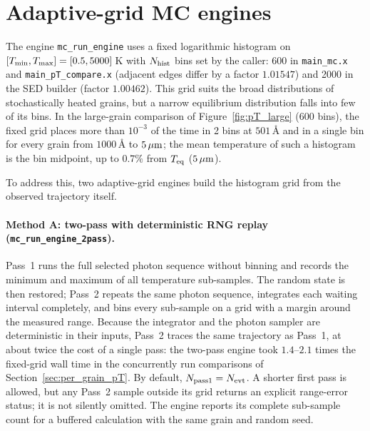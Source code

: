 \documentclass{my_memo}
\newcommand{\Teq}{T_{\rm eq}}
\newcommand{\umc}{\,\mu{\rm m}}
\newcommand{\evt}{N_{\rm evt}}
\begin{document}
\section{Adaptive-grid MC engines}\label{sec:adaptive}

The engine \verb|mc_run_engine| uses a fixed logarithmic histogram on
$[T_{\rm min}, T_{\rm max}] = [0.5, 5000]\,$K with $N_{\rm hist}$ bins
set by the caller: 600 in \verb|main_mc.x| and \verb|main_pT_compare.x|
(adjacent edges differ by a factor $1.01547$) and 2000 in the SED
builder (factor $1.00462$). This grid suits the broad distributions of
stochastically heated grains, but a narrow equilibrium distribution
falls into few of its bins. In the large-grain comparison of
Figure~\ref{fig:pT_large} (600 bins), the fixed grid places more than
$10^{-3}$ of the time in 2 bins at $501\,\textrm{\AA}$ and in a single
bin for every grain from $1000\,\textrm{\AA}$ to $5\umc$; the mean
temperature of such a histogram is the bin midpoint, up to $0.7\%$ from
$\Teq$ ($5\umc$).

To address this, two adaptive-grid engines build the histogram grid
from the observed trajectory itself.

\paragraph{Method A: two-pass with deterministic RNG replay
(\texttt{mc\_run\_engine\_2pass}).}
Pass~1 runs the full selected photon sequence without binning and
records the minimum and maximum of all temperature sub-samples. The
random state is then restored; Pass~2 repeats the same photon sequence,
integrates each waiting interval completely, and bins every sub-sample
on a grid with a margin around the measured range. Because the
integrator and the photon sampler are deterministic in their inputs,
Pass~2 traces the same trajectory as Pass~1, at about twice the cost of
a single pass: the two-pass engine took $1.4$--$2.1$ times the
fixed-grid wall time in the concurrently run comparisons of
Section~\ref{sec:per_grain_pT}. By default, $N_{\rm pass1}=\evt$. A
shorter first pass is allowed, but any Pass~2 sample outside its grid
returns an explicit range-error status; it is not silently omitted.
The engine reports its complete sub-sample count for a buffered
calculation with the same grain and random seed.
\end{document}
